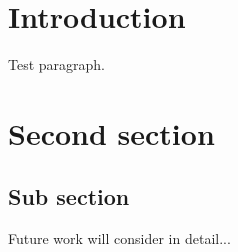 \section{Introduction}

Test paragraph. \cite{Gelman2020}

\section{Second section}

\subsection{Sub section}

Future work will consider in detail... 

\FloatBarrier
\def\UrlBreaks{\do\/\do-} %
\newpage



